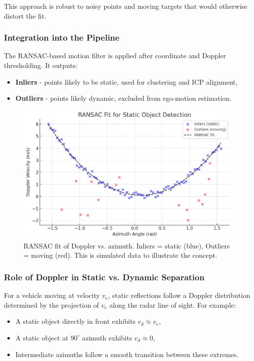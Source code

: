 This approach is robust to noisy points and moving targets that would otherwise distort the fit.

\subsubsection*{Integration into the Pipeline}
The RANSAC-based motion filter is applied after coordinate and Doppler thresholding. 
It outputs:
\begin{itemize}
    \item \textbf{Inliers} - points likely to be static, used for clustering and ICP alignment,
    \item \textbf{Outliers} - points likely dynamic, excluded from ego-motion estimation.
\end{itemize}

\begin{figure}[!htbp]
    \centering
    \includegraphics[width=1.0\linewidth]{images/RANSAC.png}
    \caption{RANSAC fit of Doppler vs. azimuth. Inliers = static (blue), Outliers = moving (red). This is simulated data to illustrate the concept.}
    \label{fig:ransac_static_dynamic}
\end{figure}

\subsubsection*{Role of Doppler in Static vs. Dynamic Separation}
For a vehicle moving at velocity $v_e$, static reflections follow a Doppler distribution determined by the projection of $v_e$ along the radar line of sight. 
For example:
\begin{itemize}
    \item A static object directly in front exhibits $v_d \approx v_e$,
    \item A static object at $90^\circ$ azimuth exhibits $v_d \approx 0$,
    \item Intermediate azimuths follow a smooth transition between these extremes.
\end{itemize}

